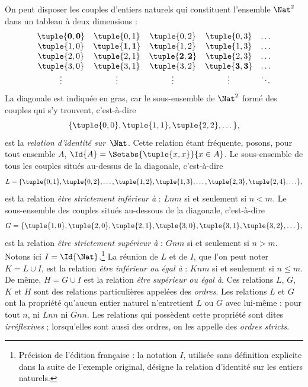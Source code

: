 \documentclass[11pt,a4paper,openany]{memoir}
\begin{document}
\begin{ex}
On peut disposer les couples d'entiers naturels qui
constituent l'ensemble $\Nat^{2}$ dans un tableau à deux dimensions :
\[
  \begin{array}{ccccc}
  \mathbf{\tuple{ 0,0 }} & \tuple{ 0,1 } &
    \tuple{ 0,2 } & \tuple{ 0,3 } & \ldots\\
  \tuple{ 1,0 } & \mathbf{\tuple{ 1,1 }} &
    \tuple{ 1,2 } & \tuple{ 1,3 } & \ldots\\
  \tuple{ 2,0 } & \tuple{ 2,1 } &
    \mathbf{\tuple{ 2,2 }} & \tuple{ 2,3 } & \ldots\\
  \tuple{ 3,0 } & \tuple{ 3,1 } & \tuple{ 3,2 } &
    \mathbf{\tuple{ 3,3 }} & \ldots\\
  \vdots & \vdots & \vdots & \vdots & \mathbf{\ddots}
  \end{array}
\]
La diagonale est indiquée en gras, car le sous-ensemble de $\Nat^2$
formé des couples qui s'y trouvent, c'est-à-dire
\[
  \{\tuple{0,0 }, \tuple{ 1,1 }, \tuple{ 2,2 }, \dots\},
  \]
est la \emph{relation d'identité sur}~$\Nat$.
Cette relation étant fréquente, posons, pour tout ensemble $A$,
$\Id{A}=\Setabs{\tuple{ x,x }}{x \in A}$.
Le sous-ensemble de tous les couples situés au-dessus
de la diagonale, c'est-à-dire
\[
  L = \{\tuple{ 0,1 },\tuple{ 0,2 },\ldots,\tuple{ 1,2 },
  \tuple{ 1,3 }, \dots, \tuple{ 2,3 }, \tuple{ 2,4 },\ldots\},
\]
est la relation \emph{être strictement inférieur à} :
$Lnm$ si et seulement si $n<m$.
Le sous-ensemble des couples situés au-dessous
de la diagonale, c'est-à-dire
\[
  G=\{ \tuple{ 1,0 },\tuple{ 2,0 },\tuple{
    2,1 }, \tuple{ 3,0 },\tuple{ 3,1 },\tuple{ 3,2 }, \dots\},
\]
est la relation \emph{être strictement supérieur à} :
$Gnm$ si et seulement si $n>m$.
Notons ici $I=\Id{\Nat}$.\footnote{Précision de l'édition
française : la notation $I$, utilisée sans définition explicite
dans la suite de l'exemple original, désigne la relation
d'identité sur les entiers naturels.}
La réunion de $L$ et de $I$, que l'on peut noter $K=L\cup I$,
est la relation \emph{être inférieur ou égal à} :
$Knm$ si et seulement si $n \le m$.
De même, $H=G \cup I$ est la relation
\emph{être supérieur ou égal à}.
Ces relations $L$, $G$, $K$ et $H$ sont des relations
particulières appelées des \emph{ordres}.
Les relations $L$ et $G$ ont la propriété qu'aucun entier naturel
n'entretient $L$ ou $G$ avec lui-même : pour tout $n$,
ni $Lnn$ ni $Gnn$.
Les relations qui possèdent cette propriété sont dites
\emph{irréflexives} ; lorsqu'elles sont aussi des ordres,
on les appelle des \emph{ordres stricts}.
\end{ex}
\end{document}
